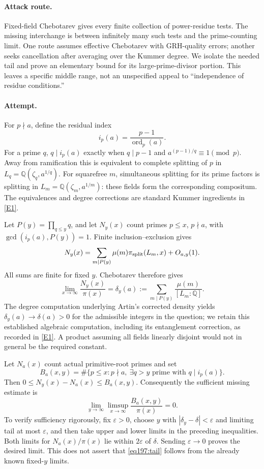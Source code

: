 \documentclass[11pt,a4paper]{article}
\newcommand{\Q}{\mathbb{Q}}
\newcommand{\eref}[2]{\hyperlink{extra:#1:#2}{[E#2]}}
\numberwithin{equation}{section}
\begin{document}
\paragraph{Attack route.}
Fixed-field Chebotarev gives every finite collection of power-residue tests. The missing interchange is between infinitely many such tests and the prime-counting limit. One route assumes effective Chebotarev with GRH-quality errors; another seeks cancellation after averaging over the Kummer degree. We isolate the needed tail and prove an elementary bound for its large-prime-divisor portion. This leaves a specific middle range, not an unspecified appeal to ``independence of residue conditions.''

\paragraph{Attempt.}
For $p\nmid a$, define the residual index
\[
 i_p(a)=\frac{p-1}{\operatorname{ord}_p(a)}.
\]
For a prime $q$, $q\mid i_p(a)$ exactly when $q\mid p-1$ and $a^{(p-1)/q}\equiv1\pmod p$. Away from ramification this is equivalent to complete splitting of $p$ in
$L_q=\Q(\zeta_q,a^{1/q})$. For squarefree $m$, simultaneous splitting for its prime factors is splitting in $L_m=\Q(\zeta_m,a^{1/m})$: these fields form the corresponding compositum. The equivalences and degree corrections are standard Kummer ingredients in \eref{statement}{1}.

Let $P(y)=\prod_{q\le y}q$, and let $N_y(x)$ count primes $p\le x$, $p\nmid a$, with $\gcd(i_p(a),P(y))=1$. Finite inclusion--exclusion gives
\begin{equation}\label{eq197:finite}
 N_y(x)=\sum_{m\mid P(y)}\mu(m)\pi_{\rm split}(L_m,x)+O_{a,y}(1).
\end{equation}
All sums are finite for fixed $y$. Chebotarev therefore gives
\[
 \lim_{x\to\infty}\frac{N_y(x)}{\pi(x)}
 =\delta_y(a):=\sum_{m\mid P(y)}\frac{\mu(m)}{[L_m:\Q]}.
\]
The degree computation underlying Artin's corrected density yields
$\delta_y(a)\to\delta(a)>0$ for the admissible integers in the question; we retain this established algebraic computation, including its entanglement correction, as recorded in \eref{statement}{1}. A product assuming all fields linearly disjoint would not in general be the required constant.

Let $N_a(x)$ count actual primitive-root primes and set
\[
 B_a(x,y)=\#\{p\le x:p\nmid a,\ \exists q>y\text{ prime with }q\mid i_p(a)\}.
\]
Then $0\le N_y(x)-N_a(x)\le B_a(x,y)$. Consequently the sufficient missing estimate is
\begin{equation}\label{eq197:tail}
 \lim_{y\to\infty}\limsup_{x\to\infty}
       \frac{B_a(x,y)}{\pi(x)}=0.
\end{equation}
To verify sufficiency rigorously, fix $\varepsilon>0$, choose $y$ with $|\delta_y-\delta|<\varepsilon$ and limiting tail at most $\varepsilon$, and then take upper and lower limits in the preceding inequalities. Both limits for $N_a(x)/\pi(x)$ lie within $2\varepsilon$ of $\delta$. Sending $\varepsilon\to0$ proves the desired limit. This does not assert that \eqref{eq197:tail} follows from the already known fixed-$y$ limits.
\end{document}
